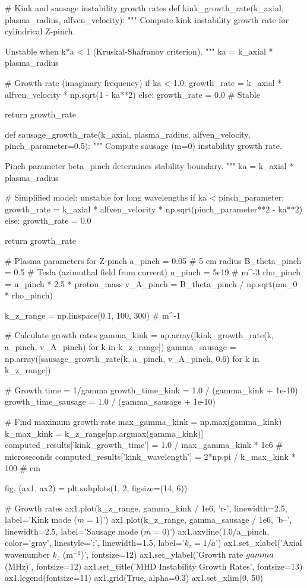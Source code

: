 \documentclass[11pt,a4paper]{article}
\begin{document}
\begin{pycode}
# Kink and sausage instability growth rates
def kink_growth_rate(k_axial, plasma_radius, alfven_velocity):
    """
    Compute kink instability growth rate for cylindrical Z-pinch.

    Unstable when k*a < 1 (Kruskal-Shafranov criterion).
    """
    ka = k_axial * plasma_radius

    # Growth rate (imaginary frequency)
    if ka < 1.0:
        growth_rate = k_axial * alfven_velocity * np.sqrt(1 - ka**2)
    else:
        growth_rate = 0.0  # Stable

    return growth_rate

def sausage_growth_rate(k_axial, plasma_radius, alfven_velocity,
                        pinch_parameter=0.5):
    """
    Compute sausage (m=0) instability growth rate.

    Pinch parameter beta_pinch determines stability boundary.
    """
    ka = k_axial * plasma_radius

    # Simplified model: unstable for long wavelengths
    if ka < pinch_parameter:
        growth_rate = k_axial * alfven_velocity * np.sqrt(pinch_parameter**2 - ka**2)
    else:
        growth_rate = 0.0

    return growth_rate

# Plasma parameters for Z-pinch
a_pinch = 0.05  # 5 cm radius
B_theta_pinch = 0.5  # Tesla (azimuthal field from current)
n_pinch = 5e19  # m^-3
rho_pinch = n_pinch * 2.5 * proton_mass
v_A_pinch = B_theta_pinch / np.sqrt(mu_0 * rho_pinch)

k_z_range = np.linspace(0.1, 100, 300)  # m^-1

# Calculate growth rates
gamma_kink = np.array([kink_growth_rate(k, a_pinch, v_A_pinch) for k in k_z_range])
gamma_sausage = np.array([sausage_growth_rate(k, a_pinch, v_A_pinch, 0.6)
                          for k in k_z_range])

# Growth time = 1/gamma
growth_time_kink = 1.0 / (gamma_kink + 1e-10)
growth_time_sausage = 1.0 / (gamma_sausage + 1e-10)

# Find maximum growth rate
max_gamma_kink = np.max(gamma_kink)
k_max_kink = k_z_range[np.argmax(gamma_kink)]
computed_results['kink_growth_time'] = 1.0 / max_gamma_kink * 1e6  # microseconds
computed_results['kink_wavelength'] = 2*np.pi / k_max_kink * 100  # cm

fig, (ax1, ax2) = plt.subplots(1, 2, figsize=(14, 6))

# Growth rates
ax1.plot(k_z_range, gamma_kink / 1e6, 'r-', linewidth=2.5, label='Kink mode ($m=1$)')
ax1.plot(k_z_range, gamma_sausage / 1e6, 'b--', linewidth=2.5, label='Sausage mode ($m=0$)')
ax1.axvline(1.0/a_pinch, color='gray', linestyle=':', linewidth=1.5, label='$k_z = 1/a$')
ax1.set_xlabel('Axial wavenumber $k_z$ (m$^{-1}$)', fontsize=12)
ax1.set_ylabel('Growth rate $\\gamma$ (MHz)', fontsize=12)
ax1.set_title('MHD Instability Growth Rates', fontsize=13)
ax1.legend(fontsize=11)
ax1.grid(True, alpha=0.3)
ax1.set_xlim(0, 50)


\end{pycode}
\end{document}
